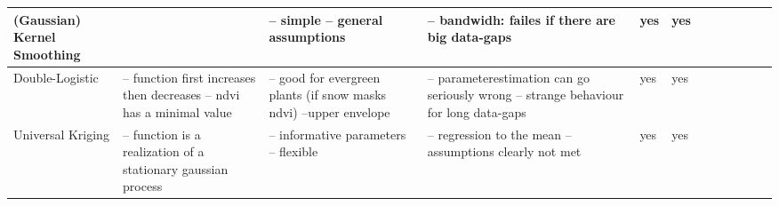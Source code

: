 \begin{table}[!ht]
\begin{tabular}{p{1.6cm}p{3.3cm}p{3.3cm}p{3.3cm}p{0.4cm}p{0.4cm}p{3cm}p{3cm}p{3cm}p{3cm}p{3cm}p{3cm}|}
    (Gaussian) Kernel Smoothing &
	~ &
	-- simple -- general assumptions &
	-- bandwidh: failes if there are big data-gaps  &
	yes &
	yes \\ \hline%
    
    Double-Logistic &
	-- function first increases then decreases -- ndvi has a minimal value &
	-- good for evergreen plants (if snow masks ndvi) --upper envelope  &
	-- parameterestimation can go seriously wrong -- strange behaviour for long data-gaps &
	yes &
	yes \\ \hline%
    
    Universal Kriging &
	-- function is a realization of a stationary gaussian process &
	-- informative parameters -- flexible &
	-- regression to the mean -- assumptions clearly not met &
	yes &
	yes \\ \hline%


    \hline
    \end{tabular}
\end{table}
